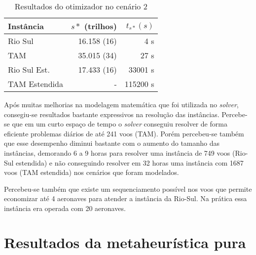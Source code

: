 \begin{table}[ht]
\caption{Resultados do otimizador no cenário 2}\label{tab:cenario2}

\begin{center}
\begin{tabular}{l |r r}
\hline

Instância 			& $s*$ (trilhos) & $t_{s*}(s)$ 
\\
\hline

Rio Sul 			& 16.158 (16) & 4 s		\\
TAM     			& 35.015 (34) & 27 s	\\
Rio Sul Est. 	& 17.433 (16) & 33001 s	 	\\ 
TAM Estendida 		& - 		  & 115200 s\\

\hline
\end{tabular}
\end{center}

\end{table}

Após muitas melhorias na modelagem matemática que foi utilizada no
\textit{solver}, consegiu-se resultados bastante expressivos na resolução das
instâncias. Percebe-se que em um curto espaço de tempo o \textit{solver}
conseguiu resolver de forma eficiente problemas diários de até 241 voos (TAM).
Porém percebeu-se também que esse desempenho diminui bastante com o aumento do
tamanho das instâncias, demorando 6 a 9 horas para resolver uma instância de
749 voos (Rio-Sul estendida) e não conseguindo resolver em 32 horas uma
instância com 1687 voos (TAM estendida) nos cenários que foram modelados.

Percebeu-se também que existe um sequenciamento possível nos voos que permite
economizar até 4 aeronaves para atender a instância da Rio-Sul. Na prática essa
instância era operada com 20 aeronaves.


\section{Resultados da metaheurística pura} \label{result:metaheuristica}

